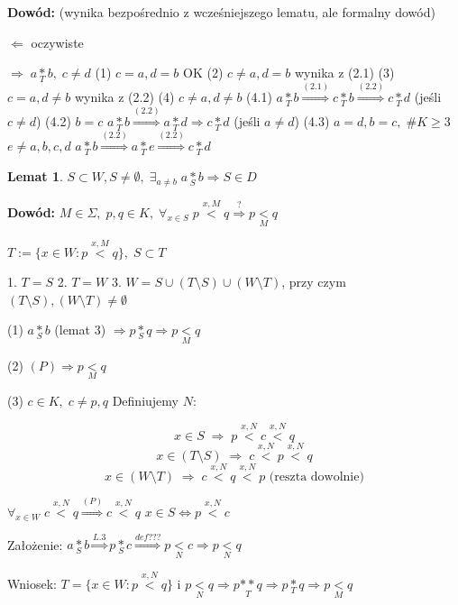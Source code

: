 \documentclass[12pt,a4paper]{article}
\theoremstyle{break}
\newtheorem{lemma}{Lemat}[section]
\begin{document}
	\noindent \textbf{Dowód:} (wynika bezpośrednio z wcześniejszego lematu, ale formalny dowód)  
	
	$\Leftarrow$ oczywiste  
	
	$\Rightarrow \; a\underset{T}{*}b, \; c\neq d$  
	(1) $c=a, d=b$ OK  
	(2) $c\neq a, d=b$ wynika z (2.1)  
	(3) $c=a, d\neq b$ wynika z (2.2)  
	(4) $c\neq a, d\neq b$  
	(4.1) $a\underset{T}{*}b \overset{(2.1)}{\Rightarrow} c\underset{T}{*}b \overset{(2.2)}{\Rightarrow} c\underset{T}{*}d$ (jeśli $c\neq d$)  
	(4.2) $b=c$  
	$a\underset{T}{*}b \overset{(2.2)}{\Rightarrow} a\underset{T}{*}d \Rightarrow c \underset{T}{*}d$ (jeśli $a\neq d$)  
	(4.3) $a=d, b=c, \; \#K\geq 3$  
	$e\neq a,b,c,d$  
	$a\underset{T}{*}b \overset{(2.2)}{\Rightarrow} a\underset{T}{*}e \overset{(2.2)}{\Rightarrow} c\underset{T}{*}d$  
	
	\begin{lemma}
		$S \subset W, S\neq \emptyset, \; \exists_{a\neq b} \; a\underset{S}{*}b \Rightarrow S\in D$
	\end{lemma}
	
	\noindent \textbf{Dowód:} 
	$M\in \Sigma, \; p,q \in K, \; \forall_{x\in S} \; p\overset{x,M}{<}q \overset{?}{\Rightarrow} p\underset{M}{<}q$  
	
	$T:=\{ x\in W : p\overset{x,M}{<}q\}, \; S\subset T$  
	
	1. $T=S$  
	2. $T=W$  
	3. $W=S \cup (T\setminus S) \cup (W\setminus T)$, przy czym $(T\setminus S),(W\setminus T)\neq \emptyset$  
	
	(1) $a\underset{S}{*}b$ (lemat 3) $\Rightarrow p\underset{S}{*}q \Rightarrow p\underset{M}{<}q$  
	
	(2) $(P) \Rightarrow p\underset{M}{<}q$  
	
	(3) $c\in K, \; c\neq p,q$  
	Definiujemy $N$:  
	
	\[
	x\in S \; \Rightarrow \; p\overset{x,N}{<}c\overset{x,N}{<}q  
	\]  
	\[
	x\in (T\setminus S) \; \Rightarrow \; c\overset{x,N}{<}p\overset{x,N}{<}q  
	\]  
	\[
	x\in (W\setminus T) \; \Rightarrow \; c\overset{x,N}{<}q\overset{x,N}{<}p \text{ (reszta dowolnie)}  
	\]
	
	$\forall_{x\in W} \; c\overset{x,N}{<}q \overset{(P)}{\Rightarrow} c\overset{x,N}{<}q$  
	$x\in S \Leftrightarrow p\overset{x,N}{<}c$  
	
	Założenie: $a\underset{S}{*}b \overset{L. 3}{\Rightarrow} p\underset{S}{*}c \overset{def ???}{\Rightarrow} p \underset{N}{<}c \Rightarrow p\underset{N}{<}q$  
	
	Wniosek:  
	$T=\{ x\in W : p\overset{x,N}{<}q\}$ i $p\underset{N}{<}q \Rightarrow p\underset{T}{**}q \Rightarrow p\underset{T}{*}q \Rightarrow p\underset{M}{<}q$  
	
\end{document}
